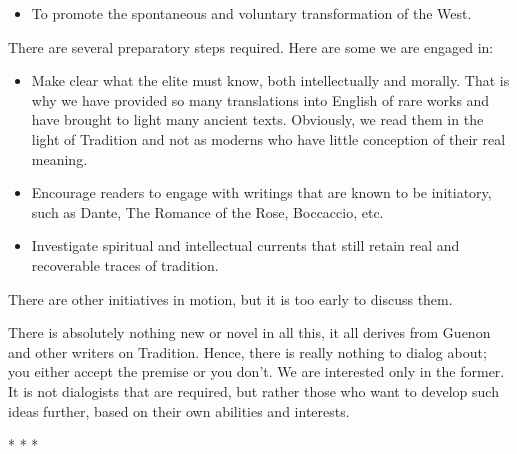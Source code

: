 \begin{itemize}
\item To promote the spontaneous and voluntary transformation of the West. 
\end{itemize}
There are several preparatory steps required. Here are some we are engaged in:

\begin{itemize}
\item Make clear what the elite must know, both intellectually and morally. That is why we have provided so many translations into English of rare works and have brought to light many ancient texts. Obviously, we read them in the light of Tradition and not as moderns who have little conception of their real meaning. 
\item Encourage readers to engage with writings that are known to be initiatory, such as Dante, The Romance of the Rose, Boccaccio, etc. 
\item Investigate spiritual and intellectual currents that still retain real and recoverable traces of tradition. 
\end{itemize}
There are other initiatives in motion, but it is too early to discuss them.

There is absolutely nothing new or novel in all this, it all derives from Guenon and other writers on Tradition. Hence, there is really nothing to dialog about; you either accept the premise or you don't. We are interested only in the former. It is not dialogists that are required, but rather those who want to develop such ideas further, based on their own abilities and interests.




\begin{center}* * *\end{center}

